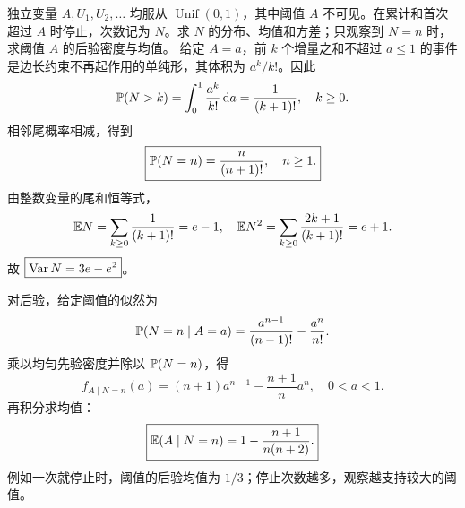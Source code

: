 独立变量 $A,U_1,U_2,\ldots$ 均服从 $\operatorname{Unif}(0,1)$，其中阈值 $A$ 不可见。在累计和首次超过 $A$ 时停止，次数记为 $N$。求 $N$ 的分布、均值和方差；只观察到 $N=n$ 时，求阈值 $A$ 的后验密度与均值。
\solution 给定 $A=a$，前 $k$ 个增量之和不超过 $a\le1$ 的事件是边长约束不再起作用的单纯形，其体积为 $a^k/k!$。因此
\[
\mathbb{P}(N>k)=\int_0^1\frac{a^k}{k!}\,\mathrm{d} a=\frac1{(k+1)!},\quad k\ge0.
\]
相邻尾概率相减，得到
\[
\boxed{\mathbb{P}(N=n)=\frac n{(n+1)!},\quad n\ge1.}
\]
由整数变量的尾和恒等式，
\[
\mathbb{E} N=\sum_{k\ge0}\frac1{(k+1)!}=e-1,
\quad \mathbb{E} N^2=\sum_{k\ge0}\frac{2k+1}{(k+1)!}=e+1.
\]
故 $\boxed{\operatorname{Var} N=3e-e^2}$。

对后验，给定阈值的似然为
\[
\mathbb{P}(N=n\mid A=a)=\frac{a^{n-1}}{(n-1)!}-\frac{a^n}{n!}.
\]
乘以均匀先验密度并除以 $\mathbb{P}(N=n)$，得
\[
\boxed{f_{A\mid N=n}(a)=(n+1)a^{n-1}-\frac{n+1}{n}a^n,
\quad0<a<1.}
\]
再积分求均值：
\[
\boxed{\mathbb{E}(A\mid N=n)=1-\frac{n+1}{n(n+2)}.}
\]
例如一次就停止时，阈值的后验均值为 $1/3$；停止次数越多，观察越支持较大的阈值。
